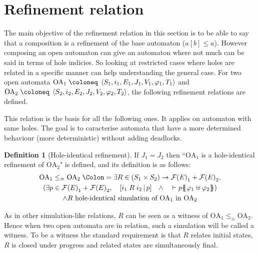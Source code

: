 \documentclass{article}
\theoremstyle{plain}
\theoremstyle{definition}
\newtheorem{defi}{Definition}
\newcommand\mpar[1]{{\left(#1\right)}}
\newcommand\mbrk[1]{{\left[#1\right]}}
\newcommand\mbrc[1]{{\left\{#1\right\}}}
\newcommand\psubst[1]{\mbrc{\!\!\mbrc{#1}\!\!}}
\newcommand\midbar{\,\middle|\,}
\newcommand\prel[4]{\mbrk{#2\mathrel{#1}#3\midbar #4}}
\newcommand\defnotation{\DOTSB\;{\Colon=}\;}
\newcommand\defobject{\DOTSB\;{\coloneq}\;}
\newcommand\qwedge{\DOTSB\quad{\wedge}\quad}
\newcommand\fformulas[1]{{\mathcal{F}\mpar{#1}}}
\newcommand\OA[7]{\left<#1,#2,#3,#4, #5,#6,#7\right>}
\begin{document}


\section{Refinement relation}
The main objective of the refinement relation in this section is to be able to say that a composition is a refinement of the base automaton (\(a\mbrk{b} \leq a\)).
However composing an open automaton can give an automaton where not much can be said in terms of hole indicies.
So looking at restricted cases where holes are related in a specific manner can help understanding the general case.
For two open automata \(\mathrm{OA}_1 \defobject \OA{S_1}{i_1}{E_1}{J_1}{V_1}{\varphi_1}{T_1}\) and \(\mathrm{OA}_2 \defobject \OA{S_2}{i_2}{E_2}{J_2}{V_2}{\varphi_2}{T_2}\), the following refinement relations are defined.

This relation is the basis for all the following ones.
It applies on automaton with same holes.
The goal is to caracterise automata that have a more determined behaviour (more deterministic) without adding deadlocks.
\begin{defi}[Hole-identical refinement]
If \(J_1 = J_2\) then ``\(\mathrm{OA}_1\) is a hole-identical refinement of \(\mathrm{OA}_2\)" is defined, and its definition is as follows:
\begin{multline*}
	\mathrm{OA}_1 \leq_\equiv \mathrm{OA}_2 \defnotation \exists R \in \mpar{S_1 \times S_2} \to \fformulas{E}_1 + \fformulas{E}_2, \\
	\mpar{\exists p \in \fformulas{E}_1 + \fformulas{E}_2, \quad \prel{R}{i_1}{i_2}{p} \qwedge \vdash p\psubst{\varphi_1 \uplus \varphi_2}} \\
	\wedge R \text{ hole-identical simulation of } \mathrm{OA}_1 \text{ in } \mathrm{OA}_2
\end{multline*}
\end{defi}
As in other simulation-like relations, \(R\) can be seen as a witness of \(\mathrm{OA}_1 \leq_\equiv \mathrm{OA}_2\).
Hence when two open automata are in relation, such a simulation will be called a witness.
To be a witness the standard requirement is that \(R\) relates initial states, \(R\) is closed under progress and related states are simultaneously final.
\end{document}
